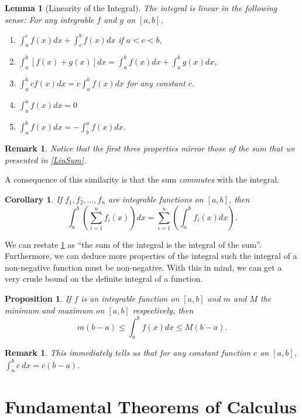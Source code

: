 \documentclass[12pt]{article}
\newtheorem{cor}[thm]{Corollary}
\newtheorem{prop}[thm]{Proposition}
\newtheorem{lem}[thm]{Lemma}
\theoremstyle{definition}
\theoremstyle{plain}
\newtheorem{rem}[thm]{Remark}
\numberwithin{equation}{section}
\begin{document}
\begin{lem}[Linearity of the Integral]
The integral is linear in the following sense: For any integrable $f$ and $g$ on $[a,b]$,
\begin{enumerate}
  \item $\int_{a}^{c}f(x)dx+\int_{c}^{b}f(x)dx$ if $a<c<b$,
  \item $\int_{a}^{b}[f(x)+g(x)]dx=\int_{a}^{b}f(x)dx+\int_{a}^{b}g(x)dx$,
  \item $\int_{a}^{b}c f(x)dx=c\int_{a}^{b}f(x)dx$ for any constant $c$.
  \item $\int_{a}^af(x)dx=0$
  \item $\int_{a}^{b}f(x)dx=-\int_{b}^{a}f(x)dx$.
\end{enumerate}
\end{lem}
\begin{rem}
  Notice that the first three properties mirror those of the sum that we presented in \cref{LinSum}.
\end{rem}
A consequence of this similarity is that the sum \emph{commutes} with the integral.
\begin{cor}\label{SumIntCom}
  If $f_1, f_2, \dotsc, f_n$ are integrable functions on $[a,b]$, then
  \begin{equation}
    \int_{a}^{b}\left(\sum_{i=1}^{n}f_i(x) \right)dx= \sum_{i=1}^{n}\left(\int_{a}^{b}f_{i}(x)dx\right).
  \end{equation}
\end{cor}
We can restate \cref{SumIntCom} as ``the sum of the integral is the integral of the sum''. Furthermore, we can deduce more properties of the integral  such the integral of a non-negative function must be non-negative. With this in mind, we can get a very crude bound on the definite integral of a function.


\begin{prop}
  If $f$ is an integrable function on $[a,b]$ and $m$ and $M$ the minimum and maximum on $[a,b]$ respectively, then
  \begin{equation}
    m(b-a)\leq \int_{a}^{b} f(x)dx\leq M(b-a).
  \end{equation}
\end{prop}
\begin{rem}\label{ConstInt}
  This immediately tells us that for any constant function $c$ on $[a,b]$, $\int_{a}^{b} c\ dx=c(b-a)$.
\end{rem}

\section{Fundamental Theorems of Calculus}
\end{document}
